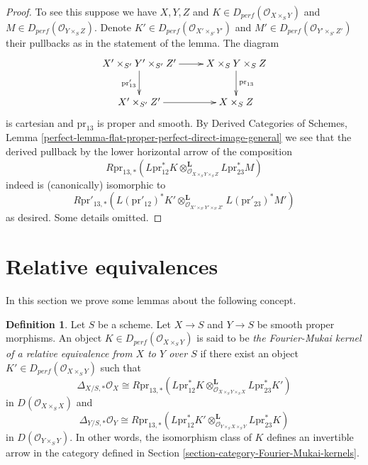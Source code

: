 \documentclass{stacks-project}
\theoremstyle{plain}
\theoremstyle{definition}
\newtheorem{definition}[subsection]{Definition}
\theoremstyle{remark}
\numberwithin{equation}{subsection}
\begin{document}
\begin{proof}
To see this suppose we have $X, Y, Z$ and
$K \in D_{perf}(\mathcal{O}_{X \times_S Y})$ and
$M \in D_{perf}(\mathcal{O}_{Y \times_S Z})$.
Denote
$K' \in D_{perf}(\mathcal{O}_{X' \times_{S'} Y'})$ and
$M' \in D_{perf}(\mathcal{O}_{Y' \times_{S'} Z'})$
their pullbacks as in the statement of the lemma.
The diagram
$$
\xymatrix{
X' \times_{S'} Y' \times_{S'} Z' \ar[r] \ar[d]_{\text{pr}'_{13}} &
X \times_S Y \times_S Z \ar[d]^{\text{pr}_{13}} \\
X' \times_{S'} Z' \ar[r] &
X \times_S Z
}
$$
is cartesian and $\text{pr}_{13}$ is proper and smooth.
By Derived Categories of Schemes, Lemma
\ref{perfect-lemma-flat-proper-perfect-direct-image-general}
we see that the derived pullback by the lower horizontal
arrow of the composition
$$
R\text{pr}_{13, *}(
L\text{pr}_{12}^*K
\otimes_{\mathcal{O}_{X \times_S Y \times_S Z}}^\mathbf{L}
L\text{pr}_{23}^*M)
$$
indeed is (canonically) isomorphic to
$$
R\text{pr}'_{13, *}(
L(\text{pr}'_{12})^*K'
\otimes_{\mathcal{O}_{X' \times_{S'} Y' \times_{S'} Z'}}^\mathbf{L}
L(\text{pr}'_{23})^*M')
$$
as desired. Some details omitted.
\end{proof}





\section{Relative equivalences}
\label{section-relative-equivalences}

\noindent
In this section we prove some lemmas about the following concept.

\begin{definition}
\label{definition-relative-equivalence-kernel}
Let $S$ be a scheme. Let $X \to S$ and $Y \to S$ be smooth proper morphisms.
An object $K \in D_{perf}(\mathcal{O}_{X \times_S Y})$
is said to be {\it the Fourier-Mukai kernel of a relative equivalence
from $X$ to $Y$ over $S$}
if there exist an object $K' \in D_{perf}(\mathcal{O}_{X \times_S Y})$
such that
$$
\Delta_{X/S, *}\mathcal{O}_X \cong
R\text{pr}_{13, *}(L\text{pr}_{12}^*K
\otimes_{\mathcal{O}_{X \times_S Y \times_S X}}^\mathbf{L}
L\text{pr}_{23}^*K')
$$
in $D(\mathcal{O}_{X \times_S X})$ and
$$
\Delta_{Y/S, *}\mathcal{O}_Y \cong
R\text{pr}_{13, *}(L\text{pr}_{12}^*K'
\otimes_{\mathcal{O}_{Y \times_S X \times_S Y}}^\mathbf{L}
L\text{pr}_{23}^*K)
$$
in $D(\mathcal{O}_{Y \times_S Y})$. In other words, the isomorphism class
of $K$ defines an invertible arrow in the category defined in
Section \ref{section-category-Fourier-Mukai-kernels}.
\end{definition}
\end{document}
